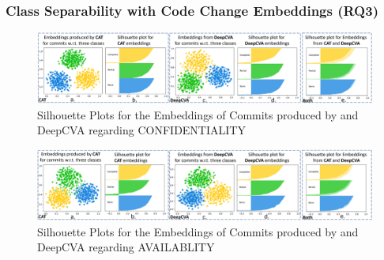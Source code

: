 \subsubsection{\bf Class Separability with Code Change Embeddings (RQ3)}


\begin{figure}[t]
	\centering
	\includegraphics[width=6.9in]{graphs/confidentiality}
        \vspace{-6pt}
	\caption{Silhouette Plots for the Embeddings of Commits produced by {\tool} and DeepCVA regarding CONFIDENTIALITY}
	\label{fig:confidentiality}
\end{figure}


\begin{figure}[t]
	\centering
	\includegraphics[width=6.9in]{graphs/availability}
       \vspace{-6pt}
	\caption{Silhouette Plots for the Embeddings of Commits produced by {\tool} and DeepCVA regarding AVAILABLITY}
	\label{fig:availability}
\end{figure}

%

